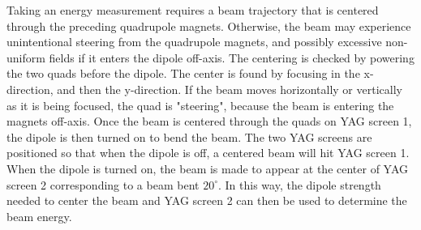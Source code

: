 Taking an energy measurement requires a beam trajectory
that is centered through the preceding quadrupole magnets. Otherwise, the beam 
may experience unintentional steering from the quadrupole magnets, and possibly excessive non-uniform fields 
if it enters the dipole off-axis. The centering is checked by powering the two 
quads before the dipole. The center is found by focusing 
in the x-direction, and then the y-direction. If the beam 
moves horizontally or vertically as it is being focused, 
the quad is "steering", because the beam is entering the magnets off-axis.
Once the beam is centered through the quads on YAG screen 1, 
the dipole is then turned on to bend the beam.
The two YAG screens are positioned so that when the dipole is off, 
a centered beam will hit YAG screen 1. When the dipole is turned
on, the beam is made to appear at the center of YAG screen 2 corresponding to a 
beam bent $20^\circ$. In this way, the dipole strength needed to center the beam and YAG screen 2 can 
then be used to determine the beam energy.

